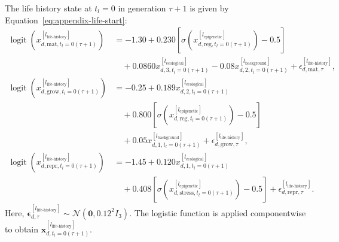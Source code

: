\documentclass[11pt]{article}
\begin{document}
The life history state at $t_l=0$ in generation $\tau+1$ is given by Equation~\ref{eq:appendix-life-start}:
\begin{equation}
\begin{aligned}
\operatorname{logit}\!\left(
x^{[l_{\mathrm{life\text{-}history}}]}_{d,\mathrm{mat},t_l=0(\tau+1)}
\right)
&=
-1.30
+0.230\!\left[
\sigma\!\left(
x^{[l_{\mathrm{epigenetic}}]}_{d,\mathrm{reg},t_l=0(\tau+1)}
\right)-0.5
\right]
\\
&\quad
+0.0860x^{[l_{\mathrm{ecological}}]}_{d,3,t_l=0(\tau+1)}
-0.08x^{[l_{\mathrm{background}}]}_{d,2,t_l=0(\tau+1)}
+\epsilon^{[l_{\mathrm{life\text{-}history}}]}_{d,\mathrm{mat},\tau},
\\
\operatorname{logit}\!\left(
x^{[l_{\mathrm{life\text{-}history}}]}_{d,\mathrm{grow},t_l=0(\tau+1)}
\right)
&=
-0.25
+0.189x^{[l_{\mathrm{ecological}}]}_{d,2,t_l=0(\tau+1)}
\\
&\quad
+0.800\!\left[
\sigma\!\left(
x^{[l_{\mathrm{epigenetic}}]}_{d,\mathrm{reg},t_l=0(\tau+1)}
\right)-0.5
\right]
\\
&\quad
+0.05x^{[l_{\mathrm{background}}]}_{d,1,t_l=0(\tau+1)}
+\epsilon^{[l_{\mathrm{life\text{-}history}}]}_{d,\mathrm{grow},\tau},
\\
\operatorname{logit}\!\left(
x^{[l_{\mathrm{life\text{-}history}}]}_{d,\mathrm{repr},t_l=0(\tau+1)}
\right)
&=
-1.45
+0.120x^{[l_{\mathrm{ecological}}]}_{d,1,t_l=0(\tau+1)}
\\
&\quad
+0.408\!\left[
\sigma\!\left(
x^{[l_{\mathrm{epigenetic}}]}_{d,\mathrm{stress},t_l=0(\tau+1)}
\right)-0.5
\right]
+\epsilon^{[l_{\mathrm{life\text{-}history}}]}_{d,\mathrm{repr},\tau}.
\end{aligned}
\label{eq:appendix-life-start}
\end{equation}
Here, $\boldsymbol{\epsilon}^{[l_{\mathrm{life\text{-}history}}]}_{d,\tau}\sim\mathcal{N}(\mathbf{0},0.12^2I_3)$. The logistic function is applied componentwise to obtain $\mathbf{x}^{[l_{\mathrm{life\text{-}history}}]}_{d,t_l=0(\tau+1)}$.
\end{document}
